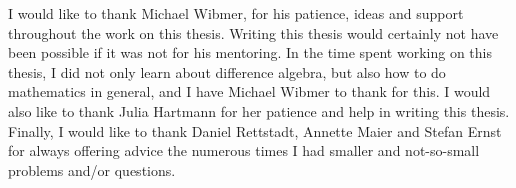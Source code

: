 I would like to thank Michael Wibmer, for his patience, ideas and support throughout the work on this thesis. Writing this thesis would certainly not have been possible if it was not for his mentoring.
In the time spent working on this thesis, I did not only learn about difference algebra, but also how to do mathematics in general, and I have Michael Wibmer to thank for this.
I would also like to thank Julia Hartmann for her patience and help in writing this thesis.
Finally, I would like to thank Daniel Rettstadt, Annette Maier and Stefan Ernst for always offering advice the numerous times I had smaller and not-so-small problems and/or questions.

